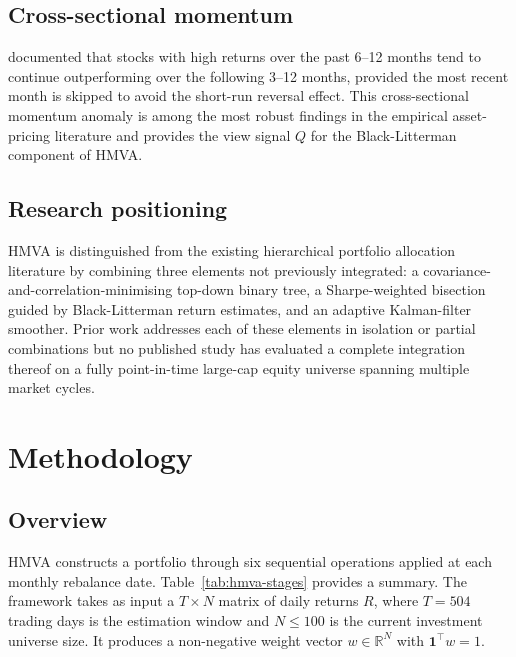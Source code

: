 \documentclass[a4paper,12pt]{report}
\begin{document}
\section{Cross-sectional momentum}
\label{sec:lit-mom}

\citet{jegadeesh1993} documented that stocks with high returns over the past
6--12 months tend to continue outperforming over the following 3--12 months,
provided the most recent month is skipped to avoid the short-run reversal
effect. This cross-sectional momentum anomaly is among the most robust findings
in the empirical asset-pricing literature \citep{famafrench1993} and provides
the view signal $Q$ for the Black-Litterman component of HMVA.

\section{Research positioning}
\label{sec:lit-gap}

HMVA is distinguished from the existing hierarchical portfolio allocation
literature by combining three elements not previously integrated: a
covariance-and-correlation-minimising top-down binary tree, a Sharpe-weighted
bisection guided by Black-Litterman return estimates, and an adaptive
Kalman-filter smoother. Prior work addresses each of these elements in
isolation or partial combinations but no published study has evaluated a
complete integration thereof on a fully point-in-time large-cap equity
universe spanning multiple market cycles.

\chapter{Methodology}
\label{ch:methodology}

\section{Overview}
\label{sec:meth-overview}

HMVA constructs a portfolio through six sequential operations applied at each
monthly rebalance date. Table~\ref{tab:hmva-stages} provides a summary.
The framework takes as input a $T \times N$ matrix of daily returns $R$,
where $T = 504$ trading days is the estimation window and $N \leq 100$ is the
current investment universe size. It produces a non-negative weight vector
$w \in \mathbb{R}^N$ with $\mathbf{1}^{\top}w = 1$.
\end{document}
